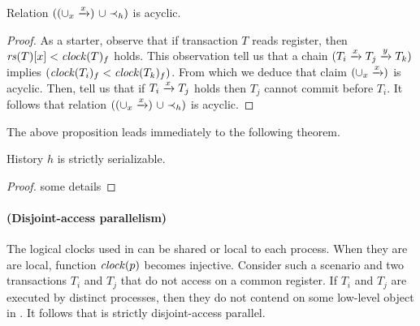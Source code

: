 \begin{proposition}  
  Relation $((\union_{x} \stmPrec{x}) ~\union \hb_h)$ is acyclic.
\end{proposition}

\begin{proof}
  As a starter, observe that if transaction $T$ reads register, then $\readSetOf{T}[x] < \clockOf{T}_f$ holds.
  This observation tell us that a chain $(T_i \stmPrec{x} T_j \stmPrec{y} T_k)$ implies $(\clockOf{T_i}_f < \clockOf{T_k}_f)$.
  From which we deduce that claim $(\union_{x} \stmPrec{x})$ is acyclic.
  Then,  tell us that if $T_i \stmPrec{x} T_j$ holds then $T_j$ cannot commit before $T_i$.
  It follows that relation $((\union_{x} \stmPrec{x}) ~\union \hb_h)$ is acyclic.  
\end{proof}

The above proposition leads immediately to the following theorem.

\begin{theorem}
  History $h$ is strictly serializable.
\end{theorem}

\begin{proof}
  some details
\end{proof}

\paragraph{(Disjoint-access parallelism)}
The logical clocks used in  can be shared or local to each process.
When they are are local, function $\clockOf{p}$ becomes injective.
Consider such a scenario and two transactions $T_i$ and $T_j$ that do not access on a common register.
If $T_i$ and $T_j$ are executed by distinct processes, then they do not contend on some low-level object in .
It follows that  is strictly disjoint-access parallel.

